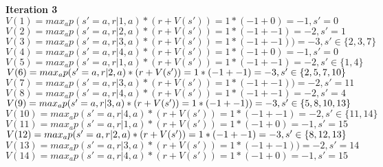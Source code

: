 \documentclass[11pt]{article}
\begin{document}
\begin{enumerate}
\begin{enumerate}
		\textbf{Iteration 3} \\
		$V(1) = max_a p(s'=a, r| 1, a) * (r + V(s')) = 1 * (-1 + 0) = -1, s' = 0$ \\
		$V(2) = max_a p(s'=a, r| 2, a) * (r + V(s')) = 1 * (-1+-1) = -2, s' = 1$ \\
		$V(3) = max_a p(s'=a, r| 3, a) * (r + V(s')) = 1 * (-1+-1)) = -3, s' \in \{2,3,7 \}$ \\
		$V(4) = max_a p(s'=a, r| 4, a) * (r + V(s')) = 1 * (-1 + 0) = -1, s' = 0$ \\
		$V(5) = max_a p(s'=a, r| 1, a) * (r + V(s')) = 1 * (-1 + -1) = -2, s' \in \{1,4\}$ \\
		$V(6) = max_a p(s'=a, r| 2, a) * (r + V(s')) = 1 * (-1+ -1) = -3, 
		\\ s' \in \{2,5,7,10\}$ \\
		$V(7) = max_a p(s'=a, r| 3, a) * (r + V(s')) = 1 * (-1+ -1)) = -2, s' = 11$ \\
		$V(8) = max_a p(s'=a, r| 4, a) * (r + V(s')) = 1 * (-1 + -1) = -2, s' = 4$ \\
		$V(9) = max_a p(s'=a, r| 3, a) * (r + V(s')) = 1 * (-1 + -1)) = -3, 
		\\ s' \in \{5,8,10,13\}$ \\
		$V(10) = max_a p(s'=a, r| 4, a) * (r + V(s')) = 1 * (-1 + -1) = -2, s' \in \{11,14\}$ \\
		$V(11) = max_a p(s'=a, r| 1, a) * (r + V(s')) = 1 * (-1 + 0) = -1, s' = 15$ \\
		$V(12) = max_a p(s'=a, r| 2, a) * (r + V(s')) = 1 * (-1+ -1) = -3, 
		\\ s' \in \{8,12,13\}$ \\
		$V(13) = max_a p(s'=a, r| 3, a) * (r + V(s')) = 1 * (-1+ -1)) = -2, s' = 14$ \\
		$V(14) = max_a p(s'=a, r| 4, a) * (r + V(s')) = 1 * (-1 + 0) = -1, s' = 15$ \\
		
	\end{enumerate}
\end{enumerate}



\end{document}
